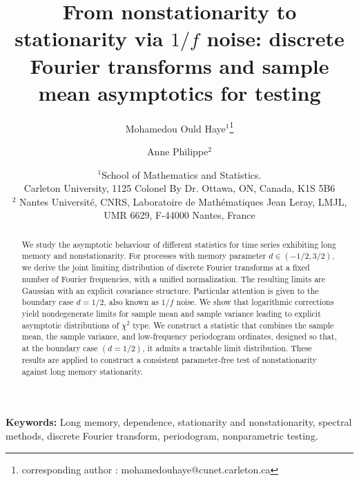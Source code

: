 \documentclass[12pt]{article}
\title{From nonstationarity to stationarity via $1/f$ noise: discrete Fourier transforms and sample mean asymptotics for testing}
\author{ Mohamedou Ould Haye$^1$\footnote{corresponding author : {mohamedouhaye@cunet.carleton.ca}} \and
  Anne Philippe$^2$
}
\date{$^1$\small  School of Mathematics and Statistics. \\
Carleton University, 1125 Colonel By Dr. Ottawa, ON, Canada, K1S 5B6
\\ $^2$ Nantes Université, CNRS, Laboratoire de Mathématiques Jean Leray, LMJL,
UMR 6629, F-44000 Nantes, France}
\numberwithin{equation}{section}
\begin{document}
\maketitle
\begin{abstract}
We study the asymptotic behaviour of different statistics for time series exhibiting long memory and nonstationarity. For processes with memory parameter $d\in(-1/2,3/2)$, we derive the joint limiting distribution of  discrete Fourier transforms at a fixed number of Fourier frequencies, with a unified normalization. The resulting limits are Gaussian with an explicit covariance structure.
Particular attention is given to the boundary case $d=1/2$, also known as $1/f$ noise. We show that logarithmic corrections yield nondegenerate limits for sample mean and sample variance leading to explicit asymptotic distributions of $\chi^2$ type. We construct a statistic that combines the sample mean, the sample variance, and low-frequency periodogram ordinates, designed so that, at the boundary case $(d=1/2)$, it admits a tractable limit distribution.
 These results are applied to construct a consistent  parameter-free  test of nonstationarity against long memory stationarity.
\end{abstract}
\textbf{Keywords:} Long memory, dependence, stationarity and nonstationarity, spectral methods, discrete Fourier transform, periodogram, nonparametric testing.
\end{document}
